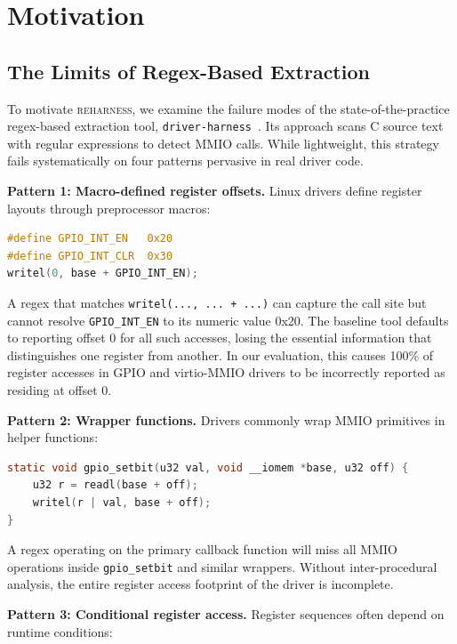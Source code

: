 \documentclass[sigplan, screen, review, anonymous]{acmart}
\newcommand{\reharness}{\textsc{reharness}}
\begin{document}
\section{Motivation}
\label{sec:motivation}

\subsection{The Limits of Regex-Based Extraction}

To motivate \reharness, we examine the failure modes of the state-of-the-practice regex-based extraction tool, \texttt{driver-harness}~\cite{driverharness}. Its approach scans C source text with regular expressions to detect MMIO calls. While lightweight, this strategy fails systematically on four patterns pervasive in real driver code.

\textbf{Pattern 1: Macro-defined register offsets.} Linux drivers define register layouts through preprocessor macros:

\begin{lstlisting}[language=C]
#define GPIO_INT_EN   0x20
#define GPIO_INT_CLR  0x30
writel(0, base + GPIO_INT_EN);
\end{lstlisting}

A regex that matches \texttt{writel(..., ... + ...)} can capture the call site but cannot resolve \texttt{GPIO\_INT\_EN} to its numeric value 0x20. The baseline tool defaults to reporting offset 0 for all such accesses, losing the essential information that distinguishes one register from another. In our evaluation, this causes 100\% of register accesses in GPIO and virtio-MMIO drivers to be incorrectly reported as residing at offset 0.

\textbf{Pattern 2: Wrapper functions.} Drivers commonly wrap MMIO primitives in helper functions:

\begin{lstlisting}[language=C]
static void gpio_setbit(u32 val, void __iomem *base, u32 off) {
    u32 r = readl(base + off);
    writel(r | val, base + off);
}
\end{lstlisting}

A regex operating on the primary callback function will miss all MMIO operations inside \texttt{gpio\_setbit} and similar wrappers. Without inter-procedural analysis, the entire register access footprint of the driver is incomplete.

\textbf{Pattern 3: Conditional register access.} Register sequences often depend on runtime conditions:
\end{document}
